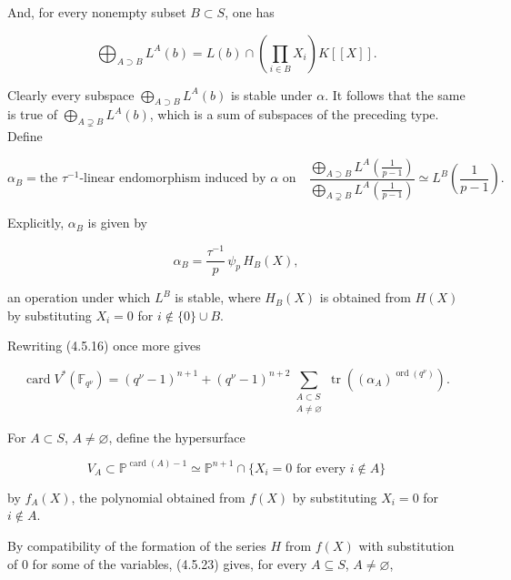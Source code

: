 \par\medskip
And, for every nonempty subset $B\subset S$, one has

\begin{equation}\tag{4.5.20}
\bigoplus_{A\supset B}L^A(b)
=L(b)\cap\left(\prod_{i\in B}X_i\right)K[[X]].
\end{equation}

Clearly every subspace $\bigoplus_{A\supset B}L^A(b)$ is stable under
$\alpha$. It follows that the same is true of
$\bigoplus_{A\supsetneq B}L^A(b)$, which is a sum of subspaces of the
preceding type. Define

\begin{equation}\tag{4.5.21}
\alpha_B=\text{the $\tau^{-1}$-linear endomorphism induced by $\alpha$ on}
\quad
\frac{\displaystyle\bigoplus_{A\supset B}
L^A\!\left(\frac1{p-1}\right)}
{\displaystyle\bigoplus_{A\supsetneq B}
L^A\!\left(\frac1{p-1}\right)}
\simeq L^B\!\left(\frac1{p-1}\right).
\end{equation}

Explicitly, $\alpha_B$ is given by

\begin{equation}\tag{4.5.22}
\alpha_B=\frac{\tau^{-1}}p\,\psi_p\,H_B(X),
\end{equation}

an operation under which $L^B$ is stable, where $H_B(X)$ is obtained from
$H(X)$ by substituting $X_i=0$ for $i\notin\{0\}\cup B$.

Rewriting (4.5.16) once more gives

\begin{equation}\tag{4.5.23}
\operatorname{card}V^*(\mathbb F_{q^\nu})
=(q^\nu-1)^{n+1}
+(q^\nu-1)^{n+2}
\sum_{\substack{A\subset S\\A\ne\varnothing}}
\operatorname{tr}\!\left((\alpha_A)^{\operatorname{ord}(q^\nu)}\right).
\end{equation}

For $A\subset S$, $A\ne\varnothing$, define the hypersurface

\begin{equation}\tag{4.5.24}
V_A\subset\mathbb P^{\operatorname{card}(A)-1}
\simeq
\mathbb P^{n+1}\cap
\{X_i=0\text{ for every }i\notin A\}
\end{equation}

by $f_A(X)$, the polynomial obtained from $f(X)$ by substituting $X_i=0$
for $i\notin A$.

By compatibility of the formation of the series $H$ from $f(X)$ with
substitution of $0$ for some of the variables, (4.5.23) gives, for every
$A\subseteq S$, $A\ne\varnothing$,

